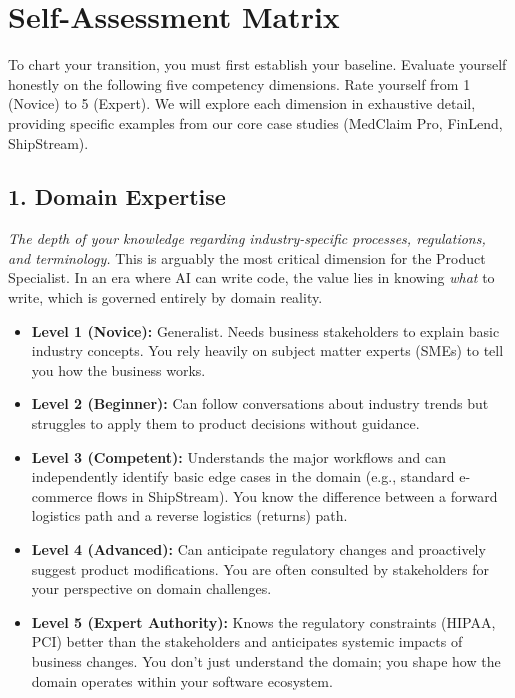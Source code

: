 \documentclass[
  11pt,
  openany,
  oneside]{book}
\providecommand{\tightlist}{%
  \setlength{\itemsep}{0pt}\setlength{\parskip}{0pt}}
\begin{document}
\bigskip

\section{Self-Assessment Matrix}\label{self-assessment-matrix}

To chart your transition, you must first establish your baseline.
Evaluate yourself honestly on the following five competency dimensions.
Rate yourself from 1 (Novice) to 5 (Expert). We will explore each
dimension in exhaustive detail, providing specific examples from our
core case studies (MedClaim Pro, FinLend, ShipStream).

\subsection{1. Domain Expertise}\label{domain-expertise}

\emph{The depth of your knowledge regarding industry-specific processes,
regulations, and terminology.} This is arguably the most critical
dimension for the Product Specialist. In an era where AI can write code,
the value lies in knowing \emph{what} to write, which is governed
entirely by domain reality.

\begin{itemize}
\tightlist
\item
  \textbf{Level 1 (Novice):} Generalist. Needs business stakeholders to
  explain basic industry concepts. You rely heavily on subject matter
  experts (SMEs) to tell you how the business works.
\item
  \textbf{Level 2 (Beginner):} Can follow conversations about industry
  trends but struggles to apply them to product decisions without
  guidance.
\item
  \textbf{Level 3 (Competent):} Understands the major workflows and can
  independently identify basic edge cases in the domain (e.g., standard
  e-commerce flows in ShipStream). You know the difference between a
  forward logistics path and a reverse logistics (returns) path.
\item
  \textbf{Level 4 (Advanced):} Can anticipate regulatory changes and
  proactively suggest product modifications. You are often consulted by
  stakeholders for your perspective on domain challenges.
\item
  \textbf{Level 5 (Expert Authority):} Knows the regulatory constraints
  (HIPAA, PCI) better than the stakeholders and anticipates systemic
  impacts of business changes. You don't just understand the domain; you
  shape how the domain operates within your software ecosystem.
\end{itemize}
\end{document}
